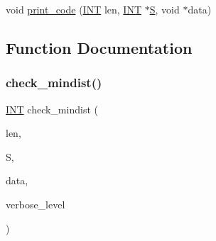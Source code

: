 \begin{DoxyCompactItemize}
\item 
void \mbox{\hyperlink{code__generator_8_c_a9b6831cb1c98ce20111c823830515d15}{print\+\_\+code}} (\mbox{\hyperlink{galois_8h_a09fddde158a3a20bd2dcadb609de11dc}{I\+NT}} len, \mbox{\hyperlink{galois_8h_a09fddde158a3a20bd2dcadb609de11dc}{I\+NT}} $\ast$\mbox{\hyperlink{simeon_8_c_adab47f8243f1b5a2c31df2535d6b37d0}{S}}, void $\ast$data)
\end{DoxyCompactItemize}


\subsection{Function Documentation}
\mbox{\label{code__generator_8_c_a4cbbea8903f9191af2e73db473ac1df0}} 
\subsubsection{\texorpdfstring{check\+\_\+mindist()}{check\_mindist()}}
{\footnotesize\ttfamily \mbox{\hyperlink{galois_8h_a09fddde158a3a20bd2dcadb609de11dc}{I\+NT}} check\+\_\+mindist (\begin{DoxyParamCaption}\item[{\mbox{\hyperlink{galois_8h_a09fddde158a3a20bd2dcadb609de11dc}{I\+NT}}}]{len,  }\item[{\mbox{\hyperlink{galois_8h_a09fddde158a3a20bd2dcadb609de11dc}{I\+NT}} $\ast$}]{S,  }\item[{void $\ast$}]{data,  }\item[{\mbox{\hyperlink{galois_8h_a09fddde158a3a20bd2dcadb609de11dc}{I\+NT}}}]{verbose\+\_\+level }\end{DoxyParamCaption})}

\mbox{\label{code__generator_8_c_a17bf777333c5e6dcb107d8de7ceffe5d}} 
